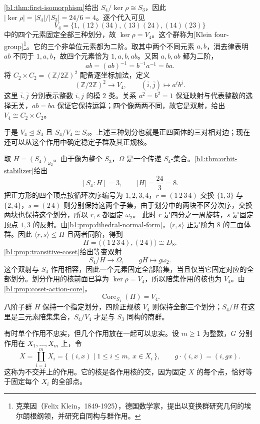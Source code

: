 \ProseParagraphBreak
\cref{b1:thm:first-isomorphism}给出 \(S_4/\ker\rho\cong S_3\)，因此 \(|\ker\rho|=|S_4|/|S_3|=24/6=4\)。逐个代入可见
\[
	V_4=\bigl\{1,(12)(34),(13)(24),(14)(23)\bigr\}
\]
中的四个元素固定全部三种划分，故 \(\ker\rho=V_4\)。这个群称为[Klein four-group]\footnote{克莱因（Felix Klein，1849-1925），德国数学家，提出以变换群研究几何的埃尔朗根纲领，并研究自同构与群作用。}。它的三个非单位元素都为二阶。取其中两个不同元素 \(a,b\)，消去律表明 \(ab\) 不同于 \(1,a,b\)，故四个元素恰为 \(1,a,b,ab\)。又因 \(a,b,ab\) 都为二阶，
\[
	ab=(ab)^{-1}=b^{-1}a^{-1}=ba.
\]
将 \(C_2\times C_2=(\mathbb Z/2\mathbb Z)^2\) 配备逐坐标加法，定义
\[
	(\mathbb Z/2\mathbb Z)^2\longrightarrow V_4,\qquad (\bar i,\bar j)\longmapsto a^ib^j.
\]
这里 \(\bar i,\bar j\) 分别表示整数 \(i,j\) 的模 \(2\) 类。关系 \(a^2=b^2=1\) 保证映射与代表整数的选择无关，\(ab=ba\) 保证它保持运算；四个像两两不同，故它是双射，给出 \(V_4\cong C_2\times C_2\)。

\ProseParagraphBreak
于是 \(V_4\trianglelefteq S_4\) 且 \(S_4/V_4\cong S_3\)。上述三种划分也就是正四面体的三对相对边；现在还可以从这个作用中确定稳定子群及其正规核。

\ProseParagraphBreak
取 \(H=(S_4)_{\omega_2}\)。由于像为整个 \(S_3\)，\(\Omega\) 是一个传递 \(S_4\)-集合。\cref{b1:thm:orbit-stabilizer}给出
\[
	[S_4:H]=3,\qquad |H|=\frac{24}{3}=8.
\]
把正方形的四个顶点按循环次序编号为 \(1,2,3,4\)，\(r=(1\,2\,3\,4)\) 交换 \(\{1,3\}\) 与 \(\{2,4\}\)，\(s=(2\,4)\) 则分别保持这两个子集，由于划分中的两块不区分次序，交换两块也保持这个划分，所以 \(r,s\) 都固定 \(\omega_2\)。 此时 \(r\) 是四分之一周旋转，\(s\) 是固定顶点 \(1,3\) 的反射。由\cref{b1:prop:dihedral-normal-form}，\(\langle r,s\rangle\) 正是阶为 \(8\) 的二面体群。因此 \(\langle r,s\rangle\leq H\) 且两者同阶，得到
\[
	H=\bigl\langle(1\,2\,3\,4),(2\,4)\bigr\rangle\cong D_8.
\]
\cref{b1:prop:transitive-coset}给出等变双射
\[
	S_4/H\longrightarrow\Omega,\qquad gH\longmapsto g\omega_2.
\]
这个双射与 \(S_4\) 作用相容，因此一个元素固定全部陪集，当且仅当它固定对应的全部划分。划分作用的核前面已算为 \(\ker\rho=V_4\)，所以陪集作用的核也为 \(V_4\)。由\cref{b1:prop:coset-action-core}，
\[
	\operatorname{Core}_{S_4}(H)=V_4.
\]
八阶子群 \(H\) 保持一个指定划分，四阶正规核 \(V_4\) 则保持全部三个划分；\(S_4/H\) 在这里是三元素陪集集合，\(S_4/V_4\) 才是与 \(S_3\) 同构的商群。

\ProseParagraphBreak
有时单个作用不忠实，但几个作用放在一起可以忠实。设 \(m\geq1\) 为整数，\(G\) 分别作用在 \(X_1,\ldots,X_m\) 上，令
\[
	X=\coprod_{i=1}^{m}X_i =\{\,(i,x)\mid 1\leq i\leq m,\ x\in X_i\,\}, \qquad g\cdot(i,x)=(i,gx).
\]
这称为不交并上的作用。它的核是各作用核的交，因为固定 \(X\) 的每个点，恰好等于固定每个 \(X_i\) 的全部点。

